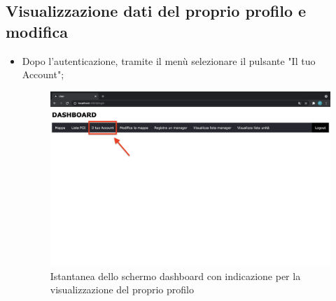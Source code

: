 \subsection{Visualizzazione dati del proprio profilo e modifica}
\begin{itemize}
    \item Dopo l'autenticazione, tramite il menù selezionare il pulsante "Il tuo Account";
    \begin{figure}[H]
        \centering
        \includegraphics[scale=0.12]{res/images/dashboard3.png}
        \caption{Istantanea dello schermo dashboard con indicazione per la visualizzazione del proprio profilo}
    \end{figure}
    

\end{itemize}
